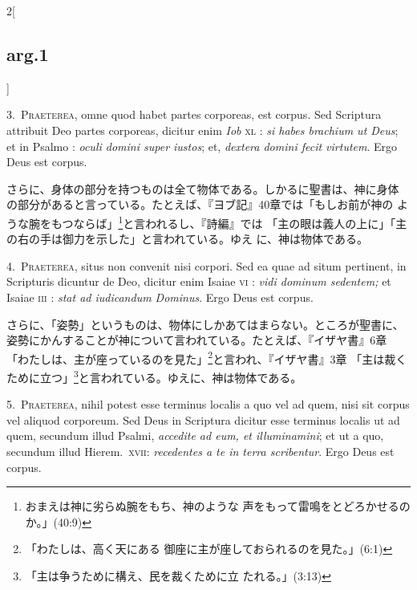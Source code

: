\documentclass[paper=a4paper,fontsize=10pt,jafontsize=9pt,titlepage]{jlreq}
\begin{document}
\begin{paracol}{2}[\subsection{arg.1}]

3.~{\scshape Praeterea}, omne quod habet partes corporeas, est corpus. Sed
Scriptura attribuit Deo partes corporeas, dicitur enim {\itshape Iob} {\scshape
xl} : {\itshape si habes brachium ut Deus}; et in Psalmo : {\itshape oculi
domini super iustos}; et, {\itshape dextera domini fecit virtutem}. Ergo
Deus est corpus.

\switchcolumn

さらに、身体の部分を持つものは全て物体である。しかるに聖書は、神に身体
の部分があると言っている。たとえば、『ヨブ記』40章では「もしお前が神の
ような腕をもつならば」\footnote{おまえは神に劣らぬ腕をもち、神のような
声をもって雷鳴をとどろかせるのか。」(40:9)}と言われるし、『詩編』では
「主の眼は義人の上に」「主の右の手は御力を示した」と言われている。ゆえ
に、神は物体である。


4.~{\scshape Praeterea}, situs non convenit nisi corpori. Sed ea quae ad
situm pertinent, in Scripturis dicuntur de Deo, dicitur enim Isaiae
{\scshape vi} : {\itshape vidi dominum sedentem;} et Isaiae {\scshape iii} : {\itshape
stat ad iudicandum Dominus}. Ergo Deus est corpus.

\switchcolumn

さらに、「姿勢」というものは、物体にしかあてはまらない。ところが聖書に、
姿勢にかんすることが神について言われている。たとえば、『イザヤ書』6章
「わたしは、主が座っているのを見た」\footnote{「わたしは、高く天にある
御座に主が座しておられるのを見た。」(6:1)}と言われ、『イザヤ書』3章
「主は裁くために立つ」\footnote{「主は争うために構え、民を裁くために立
たれる。」(3:13)}と言われている。ゆえに、神は物体である。


5.~{\scshape Praeterea}, nihil potest esse terminus localis a quo vel ad
quem, nisi sit corpus vel aliquod corporeum. Sed Deus in Scriptura
dicitur esse terminus localis ut ad quem, secundum illud Psalmi, {\itshape
accedite ad eum, et illuminamini}; et ut a quo, secundum illud
Hierem.~{\scshape xvii}: {\itshape recedentes a te in terra scribentur}. Ergo
Deus est corpus.


\end{paracol}
\end{document}
